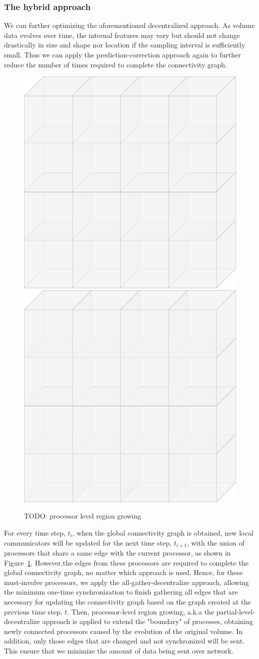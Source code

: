 \documentclass[10pt, conference, compsocconf]{IEEEtran}
\begin{document}
\subsubsection{The hybrid approach}

We can further optimizing the aforementioned decentralized approach. As volume data evolves over time, the internal features may vary but should not change drastically in size and shape nor location if the sampling interval is sufficiently small. Thus we can apply the prediction-correction approach again to further reduce the number of times required to complete the connectivity graph.

\begin{figure}[ht]
\centering
\includegraphics[width=0.45\linewidth]{grid2d.png}
\includegraphics[width=0.45\linewidth]{grid2d.png}
\caption{TODO: processor level region growing}
\label{fig:hybrid}
\end{figure}

For every time step, $t_i$, when the global connectivity graph is obtained, new local communicators will be updated for the next time step, $t_{i+1}$, with the union of processors that share a same edge with the current processor, as shown in Figure~\ref{fig:hybrid}. However,the edges from these processors are required to complete the global connectivity graph, no matter which approach is used. Hence, for these must-involve processors, we apply the all-gather-decentralize approach, allowing the minimum one-time synchronization to finish gathering all edges that are necessary for updating the connectivity graph based on the graph created at the previous time step, $t$. Then, processor-level region growing, a.k.a the partial-level-decentralize approach is applied to extend the "boundary" of processes, obtaining newly connected processors caused by the evolution of the original volume. In addition, only those edges that are changed and not synchronized will be sent. This ensure that we minimize the amount of data being sent over network.
\end{document}
